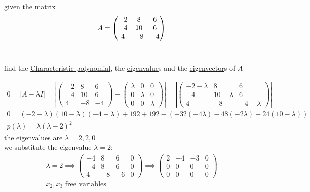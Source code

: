 \documentclass[a4paper,12pt]{article}
\begin{document}
\begin{definition}
\begin{question}
given the matrix\\
\[
  A = \pmqty{-2 & 8 & 6\\ -4 & 10 & 6\\ 4 & -8 & -4}
\]\\
\begin{subquestion}
find the \hyperref[sec:orgb773cc6]{Characteristic polynomial}, the \hyperref[sec:org929d22f]{eigenvalue}s and the \hyperref[sec:org929d22f]{eigenvector}s of \(A\)\\
\begin{answer}
\begin{gather*}
  0 = |A - \lambda I| = \left|\begin{pmatrix} -2 & 8 & 6\\ -4 & 10 & 6\\ 4 & -8 & -4 \end{pmatrix} - \begin{pmatrix} \lambda & 0 & 0\\ 0 & \lambda & 0\\ 0 & 0 & \lambda \end{pmatrix}\right| = \left|\begin{pmatrix} -2-\lambda & 8 & 6\\ -4 & 10-\lambda & 6\\ 4 & -8 & -4-\lambda \end{pmatrix}\right|\\
  0 = (-2-\lambda)(10-\lambda)(-4-\lambda)+192+192-(-32(-4\lambda)-48(-2\lambda)+24(10-\lambda))\\
  p(\lambda) = \lambda{(\lambda-2)}^2
\end{gather*}
the \hyperref[sec:org929d22f]{eigenvalue}s are \(\lambda = 2,2,0\)\\
we substitute the eigenvalue \(\lambda = 2\):\\
\begin{gather*}
  \lambda = 2 \implies \left(\begin{array}{ccc|c} -4 & 8 & 6 & 0\\ -4 & 8 & 6 & 0\\ 4 & -8 & -6 & 0 \end{array}\right) \implies \left(\begin{array}{ccc|c} 2 & -4 & -3 & 0\\ 0 & 0 & 0 & 0\\ 0 & 0 & 0 & 0 \end{array}\right)\\
  x_2,x_3 \text{ free variables}\\

\end{gather*}
\end{answer}
\end{subquestion}
\end{question}
\end{definition}
\end{document}
